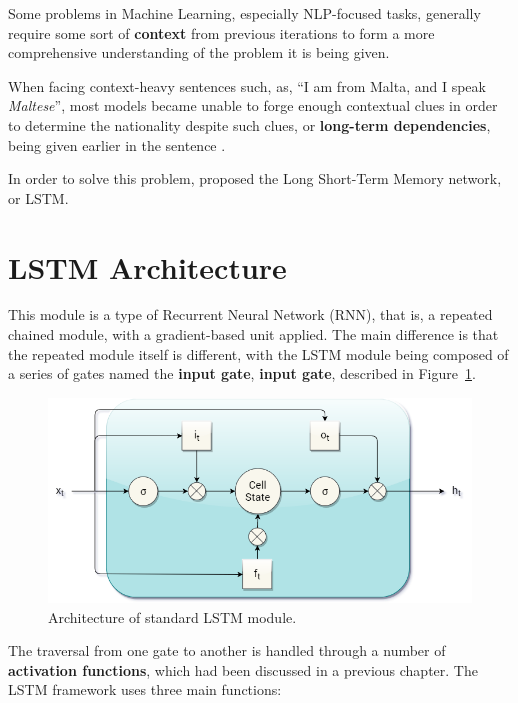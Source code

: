 \label{ch:lstm}


Some problems in Machine Learning, especially NLP-focused tasks, generally require some sort of \textbf{context} from previous iterations to form a more comprehensive understanding of the problem it is being given. 

When facing context-heavy sentences such, as, ``I am from Malta, and I speak \textit{Maltese}'', most models became unable to forge enough contextual clues in order to determine the nationality despite such clues, or \textbf{long-term dependencies}, being given earlier in the sentence \citep{bengio94}.

In order to solve this problem, \citet{hochreiter1997long} proposed the Long Short-Term Memory network, or LSTM. 

\section{LSTM Architecture}
This module is a type of Recurrent Neural Network (RNN), that is, a repeated chained module, with a gradient-based unit applied. The main difference is that the repeated module itself is different, with the LSTM module being composed of a series of gates named the \textbf{input gate}, \textbf{input gate},   described in Figure~\ref{fig:lstm_architecture}.

\begin{figure}
	\centering
	\includegraphics[width=0.6\linewidth]{graphics/lstm/lstm.png}
	\caption{
		Architecture of standard LSTM module.
	}
	\label{fig:lstm_architecture}
\end{figure}

The traversal from one gate to another is handled through a number of \textbf{activation functions}, which had been discussed in a previous chapter. The LSTM framework uses three main functions:

